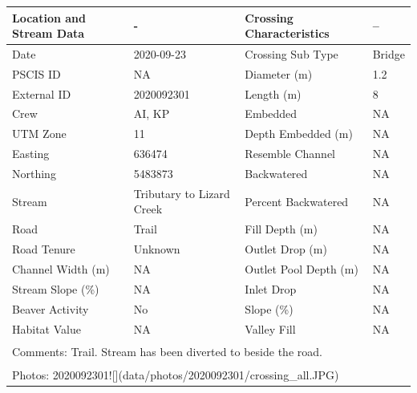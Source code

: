 \documentclass[
]{book}
\begin{document}
\begin{tabular}{llll}
\toprule
Location and Stream Data & - & Crossing Characteristics & --\\
\midrule
Date & 2020-09-23 & Crossing Sub Type & Bridge\\
PSCIS ID & NA & Diameter (m) & 1.2\\
External ID & 2020092301 & Length (m) & 8\\
Crew & AI, KP & Embedded & NA\\
UTM Zone & 11 & Depth Embedded (m) & NA\\
\addlinespace
Easting & 636474 & Resemble Channel & NA\\
Northing & 5483873 & Backwatered & NA\\
Stream & Tributary to Lizard Creek & Percent Backwatered & NA\\
Road & Trail & Fill Depth (m) & NA\\
Road Tenure & Unknown & Outlet Drop (m) & NA\\
\addlinespace
Channel Width (m) & NA & Outlet Pool Depth (m) & NA\\
Stream Slope (\%) & NA & Inlet Drop & NA\\
Beaver Activity & No & Slope (\%) & NA\\
Habitat Value & NA & Valley Fill & NA\\
\bottomrule
\multicolumn{4}{l}{\textsuperscript{} Comments: Trail. Stream has been diverted to beside the road.}\\
\multicolumn{4}{l}{\textsuperscript{} Photos: 2020092301![](data/photos/2020092301/crossing\_all.JPG)}\\
\end{tabular}
\end{document}

